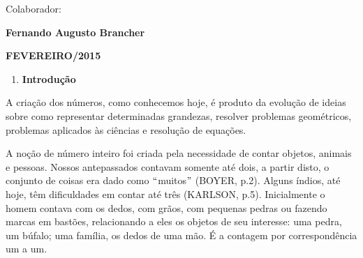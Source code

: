 \documentclass[12pt]{article}
\renewcommand{\_}{\kern-1.5pt\textunderscore\kern-1.5pt}
\begin{document}
\vspace{\baselineskip}

\vspace{\baselineskip}

\vspace{\baselineskip}
\begin{Center}
{\fontsize{14pt}{16.8pt}\selectfont Colaborador:\par}
\end{Center}\par

\begin{Center}
{\fontsize{20pt}{24.0pt}\selectfont \textbf{Fernando Augusto Brancher}\par}
\end{Center}\par


\vspace{\baselineskip}

\vspace{\baselineskip}
\begin{Center}
\textbf{FEVEREIRO/2015}
\end{Center}\par




\newpage

\vspace{\baselineskip}\setlength{\parskip}{0.0pt}
\begin{enumerate}[label*=\arabic*.]
	\item \textbf{Introdução\  }
\end{enumerate}\par

A criação dos números, como conhecemos hoje, é produto da evolução de ideias sobre como representar determinadas grandezas, resolver problemas geométricos, problemas aplicados às ciências e resolução de equações. \par

A noção de número inteiro foi criada pela necessidade de contar objetos, animais e pessoas. Nossos antepassados contavam somente até dois, a partir disto, o conjunto de coisas era dado como $``$muitos$"$  (BOYER, p.2). Alguns índios, até hoje, têm dificuldades em contar até três (KARLSON, p.5). Inicialmente o homem contava com os dedos, com grãos, com pequenas pedras ou fazendo marcas em bastões, relacionando a eles os objetos de seu interesse: uma pedra, um búfalo; uma família, os dedos de uma mão. É a contagem por correspondência um a um.\par
\end{document}

